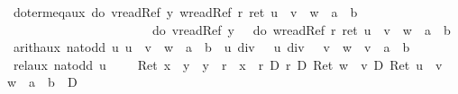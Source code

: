 \begin{isabellebody}
\isamarkupfalse%
\isamarkupfalse%
\isamarkupfalse%
\isamarkupfalse%
\isamarkupfalse%
\isamarkupfalse%
\isamarkupfalse%
\isamarkupfalse%
\isamarkupfalse%
\isamarkupfalse%
\isanewline
\isanewline
\isamarkupfalse%
\ doterm{\isacharunderscore}eq{}{\isacharunderscore}aux{\isacharcolon}\ {\isachardoublequote}do\ {\isacharbraceleft}v{\isasymleftarrow}readRef\ y{\isacharsemicolon}\ w{\isasymleftarrow}readRef\ r{\isacharsemicolon}\ ret\ {\isacharparenleft}u\ {\isacharasterisk}\ v\ {\isacharplus}\ w\ {\isacharequal}\ a\ {\isacharasterisk}\ b{\isacharparenright}{\isacharbraceright}\ {\isacharequal}\isanewline
\ \ \ \ \ \ \ \ \ \ \ \ \ \ \ \ \ \ \ \ \ \ \ do\ {\isacharbraceleft}v{\isasymleftarrow}readRef\ y{\isacharsemicolon}\ {\isasymDown}\ {\isacharparenleft}{\isasymUp}\ {\isacharparenleft}do\ {\isacharbraceleft}w{\isasymleftarrow}readRef\ r{\isacharsemicolon}\ ret\ {\isacharparenleft}u\ {\isacharasterisk}\ v\ {\isacharplus}\ w\ {\isacharequal}\ a\ {\isacharasterisk}\ b{\isacharparenright}{\isacharbraceright}{\isacharparenright}{\isacharparenright}{\isacharbraceright}{\isachardoublequote}\isamarkupfalse%
\isamarkupfalse%
\isamarkupfalse%
\isamarkupfalse%
\isamarkupfalse%
\isamarkupfalse%
\isamarkupfalse%
\isamarkupfalse%
\isamarkupfalse%
\isamarkupfalse%
\isamarkupfalse%
\isanewline
\isanewline
\isamarkupfalse%
\ arith{\isacharunderscore}aux{\isacharcolon}\ {\isachardoublequote}{\isasymlbrakk}nat{\isacharunderscore}odd\ u{\isacharsemicolon}\ u\ {\isacharasterisk}\ v\ {\isacharplus}\ w\ {\isacharequal}\ a\ {\isacharasterisk}\ b{\isasymrbrakk}\ {\isasymLongrightarrow}\ {\isacharparenleft}u\ div\ {}\ {\isacharplus}\ u\ div\ {}{\isacharparenright}\ {\isacharasterisk}\ v\ {\isacharplus}\ {\isacharparenleft}w\ {\isacharplus}\ v{\isacharparenright}\ {\isacharequal}\ a\ {\isacharasterisk}\ b{\isachardoublequote}\isamarkupfalse%
\isamarkupfalse%
\isamarkupfalse%
\isamarkupfalse%
\isamarkupfalse%
\isamarkupfalse%
\isamarkupfalse%
\isamarkupfalse%
\isamarkupfalse%
\isamarkupfalse%
\isamarkupfalse%
\isamarkupfalse%
\isamarkupfalse%
\isamarkupfalse%
\isamarkupfalse%
\isamarkupfalse%
\isamarkupfalse%
\isamarkupfalse%
\isamarkupfalse%
\isamarkupfalse%
\isamarkupfalse%
\isanewline
\isanewline
\isamarkupfalse%
\ rel{}{\isacharunderscore}aux{\isacharcolon}\ {\isachardoublequote}nat{\isacharunderscore}odd\ u\ {\isasymLongrightarrow}\ {\isasymturnstile}\ \ {\isacharparenleft}\ Ret\ {\isacharparenleft}x\ {\isasymnoteq}\ y\ {\isasymand}\ y\ {\isasymnoteq}\ r\ {\isasymand}\ x\ {\isasymnoteq}\ r{\isacharparenright}\ {\isasymand}\isactrlsub D\ {\isacharasterisk}r\ {\isacharequal}\isactrlsub D\ Ret\ {\isacharparenleft}w\ {\isacharplus}\ v{\isacharparenright}\ {\isasymand}\isactrlsub D\ Ret\ {\isacharparenleft}u\ {\isacharasterisk}\ v\ {\isacharplus}\ w\ {\isacharequal}\ a\ {\isacharasterisk}\ b{\isacharparenright}\ {\isacharparenright}\ {\isasymlongrightarrow}\isactrlsub D\isanewline

\end{isabellebody}
